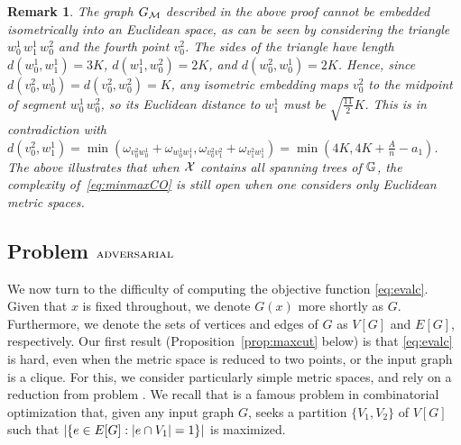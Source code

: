 \documentclass[12pt]{article}
\newtheorem{remark}{Remark}
\newcommand{\blue}[1]{{\color{black}#1}}
\begin{document}
\begin{remark}
 The graph $G_{\mathcal{M}}$ described in the above proof cannot be embedded isometrically into an Euclidean space, as can be seen by considering the triangle $w_0^1\, w_{1}^1\, w_0^2$ and the fourth point $v_0^2$. The sides of the triangle have length $d(w_0^1,w_{1}^1)=3K$, $d(w_{1}^1,w_0^2)=2K$, and $d(w_0^2,w_0^1)=2K$. Hence, since $d(v_0^2,w_0^1)=d(v_0^2,w_0^2)=K$, any isometric embedding maps $v_0^2$ to the midpoint of segment $w_0^1\,w_0^2$, so its Euclidean distance to $w_{1}^1$ must be $\sqrt{\frac{11}{2}}K$. This is in contradiction with $d(v_0^2,w_{1}^1)=\min(\omega_{v_0^2w_0^1}+\omega_{w_0^1w_{1}^1},\omega_{v_0^2v_1^2}+\omega_{v_1^2w_{1}^1})=\min(4K,4K+\frac{A}{n}-a_1)$. The above illustrates that when $\mathcal{X}$ contains all spanning trees of $\mathbb{G}$, the complexity of~\ref{eq:minmaxCO}  is still open when one considers only Euclidean metric spaces.
\end{remark}



\subsection{Problem $\textsc{adversarial}$}
\label{sec:EVALChard}

We now turn to the difficulty of computing the objective function \ref{eq:evalc}. \blue{Given that $x$ is fixed throughout, we denote $G(x)$ more shortly as $G$. Furthermore, we denote the sets of vertices and edges of $G$ as $V[G]$ and $E[G]$, respectively.} Our first result (Proposition~\ref{prop:maxcut} below) is that \ref{eq:evalc} is hard, even when the metric space is reduced to two points, or the input graph is a clique. For this, we consider particularly simple metric spaces, and rely on a reduction from problem \MAXCUT. We recall that \MAXCUT is a famous problem in combinatorial optimization that, given any input graph $G$, seeks a partition $\{V_1,V_2\}$ of $V[G]$ such that $|\{e \in E[G] : \left\lvert e \cap V_1\right\rvert=1\}|$ is maximized.
\end{document}
